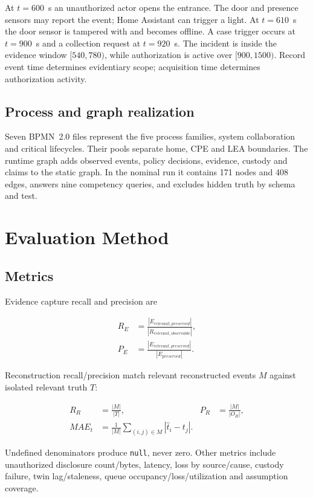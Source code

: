 ﻿\documentclass[10pt,a4paper,twocolumn]{article}
\newcommand{\code}[1]{\texttt{#1}}
\begin{document}
At \(t=600\)~s an unauthorized actor opens the entrance. The door and presence sensors may report the event; Home Assistant can trigger a light. At \(t=610\)~s the door sensor is tampered with and becomes offline. A case trigger occurs at \(t=900\)~s and a collection request at \(t=920\)~s. The incident is inside the evidence window \([540,780)\), while authorization is active over \([900,1500)\). Record event time determines evidentiary scope; acquisition time determines authorization activity.

\subsection{Process and graph realization}

Seven BPMN~2.0 files represent the five process families, system collaboration and critical lifecycles. Their pools separate home, CPE and LEA boundaries. The runtime graph adds observed events, policy decisions, evidence, custody and claims to the static graph. In the nominal run it contains 171 nodes and 408 edges, answers nine competency queries, and excludes hidden truth by schema and test.

\section{Evaluation Method}

\subsection{Metrics}

Evidence capture recall and precision are

\begin{align}
R_E&=\frac{|E_{relevant,preserved}|}{|R_{relevant,observable}|},\\
P_E&=\frac{|E_{relevant,preserved}|}{|E_{preserved}|}.
\end{align}

Reconstruction recall/precision match relevant reconstructed events \(M\) against isolated relevant truth \(T\):

\begin{align}
R_R&=\frac{|M|}{|T|}, & P_R&=\frac{|M|}{|O_R|},\\
MAE_t&=\frac{1}{|M|}\sum_{(i,j)\in M}|\hat t_i-t_j|.&&
\end{align}

Undefined denominators produce \code{null}, never zero. Other metrics include unauthorized disclosure count/bytes, latency, loss by source/cause, custody failure, twin lag/staleness, queue occupancy/loss/utilization and assumption coverage.
\end{document}
